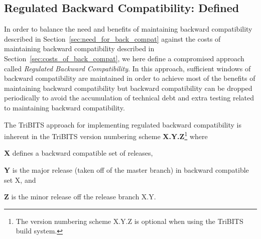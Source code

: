 \documentclass[11pt]{SANDreport}
\begin{document}
%
{}\subsection{Regulated Backward Compatibility: Defined}
\label{sec:defined_reg_back_compat}
%

In order to balance the need and benefits of maintaining backward compatibility described in Section~\ref{sec:need_for_back_compat} against the costs of maintaining backward compatibility described in Section~\ref{sec:costs_of_back_compat}, we here define a compromised approach called {}\textit{Regulated Backward Compatibility}.  In this approach, sufficient windows of backward compatibility are maintained in order to achieve most of the benefits of maintaining backward compatibility but backward compatibility can be dropped periodically to avoid the accumulation of technical debt and extra testing related to maintaining backward compatibility.

The TriBITS approach for implementing regulated backward compatibility is inherent in the TriBITS version numbering scheme {}\textbf{X.Y.Z}\footnote{The version numbering scheme X.Y.Z is optional when using the TriBITS build system.} where
%
\begin{compactitem}
%
{}\item\textbf{X} defines a backward compatible set of releases,
%
{}\item\textbf{Y} is the major release (taken off of the master branch) in backward compatible set X, and
%
{}\item\textbf{Z} is the minor release off the release branch X.Y.
%
\end{compactitem}

\begin{figure}
\begin{center}
\end{center}
\end{figure}
\end{document}
